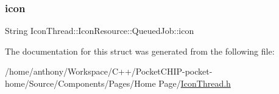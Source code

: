 \subsubsection{\texorpdfstring{icon}{icon}}
{\footnotesize\ttfamily String Icon\+Thread\+::\+Icon\+Resource\+::\+Queued\+Job\+::icon}



The documentation for this struct was generated from the following file\+:\begin{DoxyCompactItemize}
\item 
/home/anthony/\+Workspace/\+C++/\+Pocket\+C\+H\+I\+P-\/pocket-\/home/\+Source/\+Components/\+Pages/\+Home Page/\mbox{\hyperlink{IconThread_8h}{Icon\+Thread.\+h}}\end{DoxyCompactItemize}
